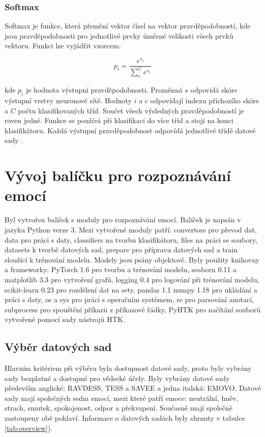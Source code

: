 \documentclass[FM,BP]{tulthesis}
\begin{document}
\subsection{Softmax} %
Softmax je funkce, která přemění vektor čísel na vektor pravděpodobností, kde jsou pravděpodobnosti pro jednotlivé prvky úměrné velikosti všech prvků vektoru. Funkci lze vyjádřit vzorcem:

\begin{equation}
\label{eqn:softmax}
p_i = \frac{e^{s_i}}{\sum_{c}^{C}e^{s_c}}
\end{equation}

kde $ p_i $ je hodnota výstupní pravděpodobnosti. Proměnná $ s $ odpovídá skóre výstupní vrstvy neuronové sítě. Hodnoty $ i $ a $ c $ odpovídají indexu příchozího skóre a $ C $ počtu klasifikovaných tříd. Součet všech výsledných pravděpodobností je roven jedné. Funkce se používá při klasifikaci do více tříd a stojí na konci klasifikátoru. Každá výstupní pravděpodobnost odpovídá jednotlivé třídě datové sady \cite{brownlee_2020_Softmax}.

\chapter{Vývoj balíčku pro rozpoznávání emocí} %
Byl vytvořen balíček s moduly pro rozpoznávání emocí. Balíček je napsán v jazyku Python verze 3. Mezi vytvořené moduly patří: convertors pro převod dat, data pro práci s daty, classifiers na tvorbu klasifikátoru, files na práci se soubory, datasets k tvorbě datových sad, prepare pro přípravu datových sad a train sloužící k trénování modelu. Modely jsou psány objektově. Byly použity knihovny a frameworky: PyTorch 1.6 pro tvorbu a trénování modelu, seaborn 0.11 a matplotlib 3.3 pro vytvoření grafů, logging 0.4 pro logování při trénování modelu, scikit-learn 0.23 pro rozdělení dat na sety, pandas 1.1 numpy 1.18 pro ukládání a práci s daty, os a sys pro práci s operačním systémem, re pro parsování anotací, subprocess pro spouštění příkazů z příkazové řádky, PyHTK pro načítání souborů vytvořené pomocí sady nástrojů HTK.

\section{Výběr datových sad} %
Hlavním kritériem při výběru byla dostupnost datové sady, proto byly vybrány sady bezplatné a dostupné pro vědecké účely. Byly vybrány datové sady především anglické: RAVDESS, TESS a SAVEE a jedna italská: EMOVO. Datové sady mají společných sedm emocí, mezi které patří emoce: neutrální, hněv, strach, smutek, spokojenost, odpor a překvapení. Současně mají společně zastoupeny obě pohlaví. Informace o datových sadách byly shrnuty v tabulce \ref{tab:overview}).
\end{document}
